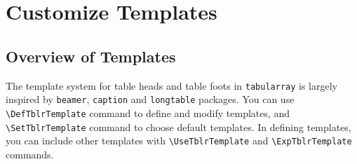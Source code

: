 \documentclass[oneside]{book}
\begin{document}
\section{Customize Templates}

\subsection{Overview of Templates}

The template system for table heads and table foots in \verb!tabularray! is largely inspired by \verb!beamer!,
\verb!caption! and \verb!longtable! packages. You can use \verb!\DefTblrTemplate! command to define and
modify templates, and \verb!\SetTblrTemplate! command to choose default templates. In defining templates,
you can include other templates with \verb!\UseTblrTemplate! and \verb!\ExpTblrTemplate! commands.
\end{document}
